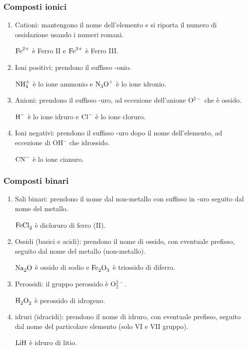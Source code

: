 \subsubsection{Composti ionici}
\begin{enumerate}
    \item Cationi: mantengono il nome dell'elemento e si riporta il numero di ossidazione usando i numeri romani. 
    \begin{ex} $\ce{Fe}^{2+}$ è Ferro II e $\ce{Fe}^{3+}$ è Ferro III.
    \end{ex}
    \item Ioni positivi: prendono il suffisso -onio.
    \begin{ex}
        $\ce{NH}_4^+$ è lo ione ammonio e $\ce{N3O+}$ è lo ione idronio.
    \end{ex}
    \item Anioni: prendono il suffisso -uro, ad eccezione dell'anione O$^{2-}$ che è ossido.
    \begin{ex}
         $\ce{H-}$ è lo ione idruro e $\ce{Cl-}$ è lo ione cloruro.
    \end{ex}
    \item Ioni negativi: prendono il suffisso -uro dopo il nome dell'elemento, ad eccezione di OH$^-$ che idrossido.
    \begin{ex}
        $\ce{CN-}$ è lo ione cianuro.
    \end{ex}
\end{enumerate}
\subsubsection{Composti binari}
\begin{enumerate}
    \item Sali binari: prendono il nome dal non-metallo con suffisso in -uro seguito dal nome del metallo.
    \begin{ex}
        $\ce{FeCl2}$ è dicloruro di ferro (II).
    \end{ex}
    \item Ossidi (basici e acidi): prendono il nome di ossido, con eventuale prefisso, seguito dal nome del metallo (non-metallo).
    \begin{ex}
        $\ce{Na2O}$ è ossido di sodio e  $\ce{Fe2O3}$ è triossido di diferro.
    \end{ex}
    \item Perossidi: il gruppo perossido è O$_2^{2-}$.
    \begin{ex} 
        $\ce{H2O2}$ è perossido di idrogeno.
    \end{ex}
    \item idruri (idracidi): prendono il nome di idruro, con eventuale prefisso, seguito dal nome del particolare elemento (solo VI e VII gruppo).
    \begin{ex}
        $\ce{LiH}$ è idruro di litio.
    \end{ex}
\end{enumerate}
